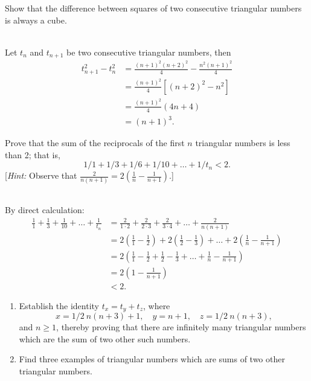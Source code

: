 \begin{exercise}
    Show that the difference between squares of two consecutive triangular numbers is always a cube. \\
\end{exercise}

\begin{solution}
    \\Let $t_n$ and $t_{n+1}$ be two consecutive triangular numbers, then
    \begin{align*}
        t_{n+1}^2 - t_{n}^2 &= \frac{(n+1)^2(n+2)^2}{4} - \frac{n^2(n+1)^2}{4} \\
        &= \frac{(n+1)^2}{4}\left[(n+2)^2 - n^2\right] \\
        &= \frac{(n+1)^2}{4}(4n+4) \\
        &= (n+1)^3.
    \end{align*}
\end{solution}

\begin{exercise}
    Prove that the sum of the reciprocals of the first $n$ triangular numbers is less than 2; that is,
    $$1/1 + 1/3 + 1/6 + 1/10 + \dots + 1/t_n < 2.$$
    [\textit{Hint:} Observe that $\displaystyle \frac{2}{n(n+1)} = 2\left( \frac{1}{n} - \frac{1}{n+1} \right).$] \\
\end{exercise}

\begin{solution}
    \\ By direct calculation:
    \begin{align*}
        \frac{1}{1} + \frac{1}{3}+ \frac{1}{10} +\dots + \frac{1}{t_n} &= \frac{2}{1 \cdot 2} + \frac{2}{2 \cdot 3} + \frac{2}{3 \cdot 4} + \dots + \frac{2}{n(n+1)} \\
        &= 2\left( \frac{1}{1} - \frac{1}{2} \right) + 2\left( \frac{1}{2} - \frac{1}{3} \right) + \dots + 2\left( \frac{1}{n} - \frac{1}{n+1} \right) \\
        &= 2\left(\frac{1}{1} - \frac{1}{2} + \frac{1}{2} - \frac{1}{3} + \dots + \frac{1}{n} - \frac{1}{n+1}\right) \\
        &= 2\left(1 - \frac{1}{n+1}\right) \\
        &< 2.
    \end{align*}
\end{solution}

\begin{exercise}
    \begin{enumerate}
        \item Establish the identity $t_x = t_y + t_z$, where 
        $$x = 1/2 \ n(n+3) + 1, \quad y = n + 1, \quad z = 1/2 \ n(n+3),$$
        and $n \geq 1$, thereby proving that there are infinitely many triangular numbers which are the sum of two other such numbers.
        \item Find three examples of triangular numbers which are sums of two other triangular numbers.
    \end{enumerate}
\end{exercise}

